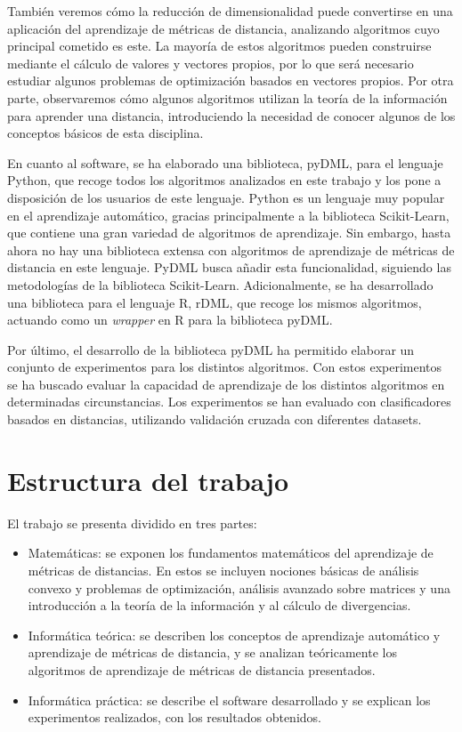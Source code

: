 También veremos cómo la reducción de dimensionalidad puede convertirse en una aplicación del aprendizaje de métricas de distancia, analizando algoritmos cuyo principal cometido es este. La mayoría de estos algoritmos pueden construirse mediante el cálculo de valores y vectores propios, por lo que será necesario estudiar algunos problemas de optimización basados en vectores propios. Por otra parte, observaremos cómo algunos algoritmos utilizan la teoría de la información para aprender una distancia, introduciendo la necesidad de conocer algunos de los conceptos básicos de esta disciplina.

En cuanto al software, se ha elaborado una biblioteca, pyDML, para el lenguaje Python, que recoge todos los algoritmos analizados en este trabajo y los pone a disposición de los usuarios de este lenguaje. Python es un lenguaje muy popular en el aprendizaje automático, gracias principalmente a la biblioteca Scikit-Learn, que contiene una gran variedad de algoritmos de aprendizaje. Sin embargo, hasta ahora no hay una biblioteca extensa con algoritmos de aprendizaje de métricas de distancia en este lenguaje. PyDML busca añadir esta funcionalidad, siguiendo las metodologías de la biblioteca Scikit-Learn. Adicionalmente, se ha desarrollado una biblioteca para el lenguaje R, rDML, que recoge los mismos algoritmos, actuando como un \emph{wrapper} en R para la biblioteca pyDML.

Por último, el desarrollo de la biblioteca pyDML ha permitido elaborar un conjunto de experimentos para los distintos algoritmos. Con estos experimentos se ha buscado evaluar la capacidad de aprendizaje de los distintos algoritmos en determinadas circunstancias. Los experimentos se han evaluado con clasificadores basados en distancias, utilizando validación cruzada con diferentes datasets.

\section{Estructura del trabajo}

El trabajo se presenta dividido en tres partes:

\begin{itemize}
    \item Matemáticas: se exponen los fundamentos matemáticos del aprendizaje de métricas de distancias. En estos se incluyen nociones básicas de análisis convexo y problemas de optimización, análisis avanzado sobre matrices y una introducción a la teoría de la información y al cálculo de divergencias.
    \item Informática teórica: se describen los conceptos de aprendizaje automático y aprendizaje de métricas de distancia, y se analizan teóricamente los algoritmos de aprendizaje de métricas de distancia presentados.
    \item Informática práctica: se describe el software desarrollado y se explican los experimentos realizados, con los resultados obtenidos.
\end{itemize}

